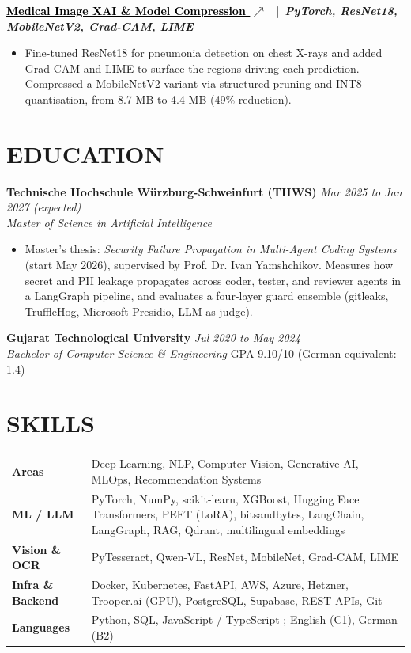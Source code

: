 \documentclass[a4paper,10pt]{article}
\newcommand{\ulink}[2]{\href{#1}{\textcolor{black}{\underline{#2}}}}
\newcommand{\extlink}{$\nearrow$}
\newcommand{\jobtitle}[1]{{\color{headingcolor}\textbf{#1}}}
\begin{document}
\vspace{2pt}
\noindent
\jobtitle{\ulink{https://github.com/omborda2002/medical-image-xai-and-model-compression}{Medical Image XAI \& Model Compression \extlink}}
\ |\ \textit{\textbf{PyTorch, ResNet18, MobileNetV2, Grad-CAM, LIME}}
\begin{itemize}
  \item Fine-tuned ResNet18 for pneumonia detection on chest X-rays and added Grad-CAM and LIME to surface the regions driving each prediction. Compressed a MobileNetV2 variant via structured pruning and INT8 quantisation, from 8.7 MB to 4.4 MB (49\% reduction).
\end{itemize}

\section*{EDUCATION}

\noindent
\jobtitle{Technische Hochschule W\"{u}rzburg-Schweinfurt (THWS)} \hfill \textit{Mar 2025 to Jan 2027 (expected)}\\
\textit{Master of Science in Artificial Intelligence}
\begin{itemize}
  \item Master's thesis: \textit{Security Failure Propagation in Multi-Agent Coding Systems} (start May 2026), supervised by Prof. Dr. Ivan Yamshchikov. Measures how secret and PII leakage propagates across coder, tester, and reviewer agents in a LangGraph pipeline, and evaluates a four-layer guard ensemble (gitleaks, TruffleHog, Microsoft Presidio, LLM-as-judge).
\end{itemize}

\vspace{2pt}
\noindent
\jobtitle{Gujarat Technological University} \hfill \textit{Jul 2020 to May 2024}\\
\textit{Bachelor of Computer Science \& Engineering} \hfill GPA 9.10/10 (German equivalent: 1.4)

\section*{SKILLS}
\vspace{1pt}
\noindent
\begin{tabularx}{\textwidth}{@{}l X@{}}
\textbf{Areas} & Deep Learning, NLP, Computer Vision, Generative AI, MLOps, Recommendation Systems \\
\textbf{ML / LLM} & PyTorch, NumPy, scikit-learn, XGBoost, Hugging Face Transformers, PEFT (LoRA), bitsandbytes, LangChain, LangGraph, RAG, Qdrant, multilingual embeddings \\
\textbf{Vision \& OCR} & PyTesseract, Qwen-VL, ResNet, MobileNet, Grad-CAM, LIME \\
\textbf{Infra \& Backend} & Docker, Kubernetes, FastAPI, AWS, Azure, Hetzner, Trooper.ai (GPU), PostgreSQL, Supabase, REST APIs, Git \\
\textbf{Languages} & Python, SQL, JavaScript / TypeScript ; English (C1), German (B2) \\
\end{tabularx}
\end{document}
